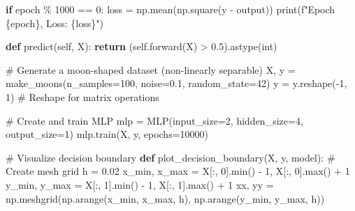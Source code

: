 \documentclass[
  letterpaper,
  DIV=11,
  numbers=noendperiod]{scrreprt}
\newenvironment{Shaded}{\begin{snugshade}}{\end{snugshade}}
\newcommand{\BuiltInTok}[1]{\textcolor[rgb]{0.00,0.23,0.31}{#1}}
\newcommand{\CommentTok}[1]{\textcolor[rgb]{0.37,0.37,0.37}{#1}}
\newcommand{\ControlFlowTok}[1]{\textcolor[rgb]{0.00,0.23,0.31}{\textbf{#1}}}
\newcommand{\DecValTok}[1]{\textcolor[rgb]{0.68,0.00,0.00}{#1}}
\newcommand{\FloatTok}[1]{\textcolor[rgb]{0.68,0.00,0.00}{#1}}
\newcommand{\KeywordTok}[1]{\textcolor[rgb]{0.00,0.23,0.31}{\textbf{#1}}}
\newcommand{\NormalTok}[1]{\textcolor[rgb]{0.00,0.23,0.31}{#1}}
\newcommand{\OperatorTok}[1]{\textcolor[rgb]{0.37,0.37,0.37}{#1}}
\newcommand{\SpecialCharTok}[1]{\textcolor[rgb]{0.37,0.37,0.37}{#1}}
\newcommand{\SpecialStringTok}[1]{\textcolor[rgb]{0.13,0.47,0.30}{#1}}
\newcommand{\VariableTok}[1]{\textcolor[rgb]{0.07,0.07,0.07}{#1}}
\begin{document}
\begin{Shaded}
\begin{Highlighting}[]
            \ControlFlowTok{if}\NormalTok{ epoch }\OperatorTok{\%} \DecValTok{1000} \OperatorTok{==} \DecValTok{0}\NormalTok{:}
\NormalTok{                loss }\OperatorTok{=}\NormalTok{ np.mean(np.square(y }\OperatorTok{{-}}\NormalTok{ output))}
                \BuiltInTok{print}\NormalTok{(}\SpecialStringTok{f"Epoch }\SpecialCharTok{\{}\NormalTok{epoch}\SpecialCharTok{\}}\SpecialStringTok{, Loss: }\SpecialCharTok{\{}\NormalTok{loss}\SpecialCharTok{\}}\SpecialStringTok{"}\NormalTok{)}
    
    \KeywordTok{def}\NormalTok{ predict(}\VariableTok{self}\NormalTok{, X):}
        \ControlFlowTok{return}\NormalTok{ (}\VariableTok{self}\NormalTok{.forward(X) }\OperatorTok{\textgreater{}} \FloatTok{0.5}\NormalTok{).astype(}\BuiltInTok{int}\NormalTok{)}

\CommentTok{\# Generate a moon{-}shaped dataset (non{-}linearly separable)}
\NormalTok{X, y }\OperatorTok{=}\NormalTok{ make\_moons(n\_samples}\OperatorTok{=}\DecValTok{100}\NormalTok{, noise}\OperatorTok{=}\FloatTok{0.1}\NormalTok{, random\_state}\OperatorTok{=}\DecValTok{42}\NormalTok{)}
\NormalTok{y }\OperatorTok{=}\NormalTok{ y.reshape(}\OperatorTok{{-}}\DecValTok{1}\NormalTok{, }\DecValTok{1}\NormalTok{)  }\CommentTok{\# Reshape for matrix operations}

\CommentTok{\# Create and train MLP}
\NormalTok{mlp }\OperatorTok{=}\NormalTok{ MLP(input\_size}\OperatorTok{=}\DecValTok{2}\NormalTok{, hidden\_size}\OperatorTok{=}\DecValTok{4}\NormalTok{, output\_size}\OperatorTok{=}\DecValTok{1}\NormalTok{)}
\NormalTok{mlp.train(X, y, epochs}\OperatorTok{=}\DecValTok{10000}\NormalTok{)}

\CommentTok{\# Visualize decision boundary}
\KeywordTok{def}\NormalTok{ plot\_decision\_boundary(X, y, model):}
    \CommentTok{\# Create mesh grid}
\NormalTok{    h }\OperatorTok{=} \FloatTok{0.02}
\NormalTok{    x\_min, x\_max }\OperatorTok{=}\NormalTok{ X[:, }\DecValTok{0}\NormalTok{].}\BuiltInTok{min}\NormalTok{() }\OperatorTok{{-}} \DecValTok{1}\NormalTok{, X[:, }\DecValTok{0}\NormalTok{].}\BuiltInTok{max}\NormalTok{() }\OperatorTok{+} \DecValTok{1}
\NormalTok{    y\_min, y\_max }\OperatorTok{=}\NormalTok{ X[:, }\DecValTok{1}\NormalTok{].}\BuiltInTok{min}\NormalTok{() }\OperatorTok{{-}} \DecValTok{1}\NormalTok{, X[:, }\DecValTok{1}\NormalTok{].}\BuiltInTok{max}\NormalTok{() }\OperatorTok{+} \DecValTok{1}
\NormalTok{    xx, yy }\OperatorTok{=}\NormalTok{ np.meshgrid(np.arange(x\_min, x\_max, h),}
\NormalTok{                         np.arange(y\_min, y\_max, h))}
    

\end{Highlighting}
\end{Shaded}
\end{document}
